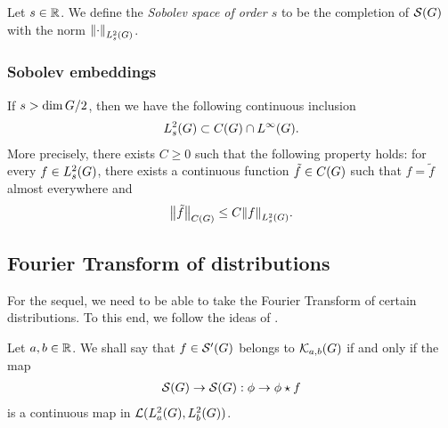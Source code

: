 \begin{definition}
\label{definition:Sobolev_spaces}
    Let $s \in \R$.
    We define the \emph{Sobolev space of order $s$} to be the completion of $\Schwartz\Group$ with the norm $\norm[\Sobolev{s}]{\dummy}$.
\end{definition}

\subsubsection{Sobolev embeddings}

\begin{proposition}
\label{proposition:Sobolev_embedding}
    If $s > \dim \Group / 2$, then we have the following continuous inclusion
    \begin{align*}
        \Sobolev{s} \subset \ContinuousFunctions\Group \cap \Lebesgue{\infty}{\Group}.
    \end{align*}
    More precisely, there exists $C \geq 0$ such that the following property holds:
    for every $f \in \Sobolev{s}$,
    there exists a continuous function $\tilde{f} \in \ContinuousFunctions\Group$ such that $f = \tilde{f}$ almost everywhere and
    \begin{align*}
        \norm[\ContinuousFunctions\Group]{\tilde{f}} \leq C \norm[\Sobolev{s}]{f}.
    \end{align*}
\end{proposition}

\subsection{Fourier Transform of distributions}

For the sequel, we need to be able to take the Fourier Transform of certain distributions.
To this end, we follow the ideas of \cite{FischerRuzhansky15}.

\begin{definition}
    Let $a, b \in \R$.
    We shall say that $f \in \TemperedDistributions\Group$ belongs to $\KernelsSobolev{a}{b}$ if and only if the map
    \begin{align*}
        \Schwartz\Group \to \Schwartz\Group : \phi \to \conv{\phi}{f}
    \end{align*}
    is a continuous map in $\Lin{\Sobolev{a}, \Sobolev{b}}$.
\end{definition}

